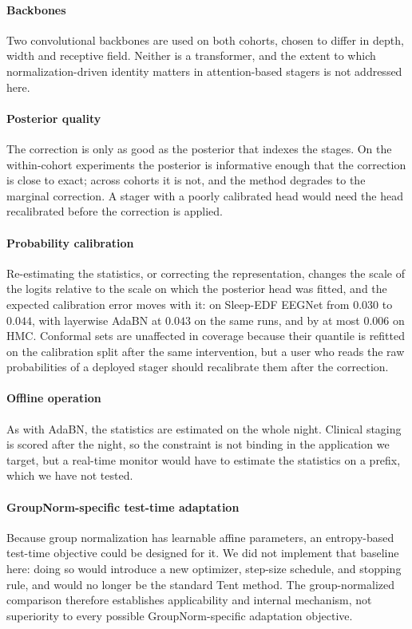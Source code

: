 \paragraph{Backbones}
Two convolutional backbones are used on both cohorts, chosen to differ in
depth, width and receptive field. Neither is a transformer, and the extent to
which normalization-driven identity matters in attention-based stagers is not
addressed here.

\paragraph{Posterior quality}
The correction is only as good as the posterior that indexes the stages. On
the within-cohort experiments the posterior is informative enough that the
correction is close to exact; across cohorts it is not, and the method
degrades to the marginal correction. A stager with a poorly calibrated head
would need the head recalibrated before the correction is applied.

\paragraph{Probability calibration}
Re-estimating the statistics, or correcting the representation, changes the
scale of the logits relative to the scale on which the posterior head was
fitted, and the expected calibration error moves with it: on Sleep-EDF EEGNet
from $0.030$ to $0.044$, with layerwise AdaBN at $0.043$ on the same runs, and
by at most $0.006$ on HMC. Conformal sets are
unaffected in coverage because their quantile is refitted on the calibration
split after the same intervention, but a user who reads the raw probabilities
of a deployed stager should recalibrate them after the correction.

\paragraph{Offline operation}
As with AdaBN, the statistics are estimated on the whole night. Clinical
staging is scored after the night, so the constraint is not binding in the
application we target, but a real-time monitor would have to estimate the
statistics on a prefix, which we have not tested.

\paragraph{GroupNorm-specific test-time adaptation}
Because group normalization has learnable affine parameters, an entropy-based
test-time objective could be designed for it. We did not implement that
baseline here: doing so would introduce a new optimizer, step-size schedule,
and stopping rule, and would no longer be the standard Tent method. The
group-normalized comparison therefore establishes applicability and internal
mechanism, not superiority to every possible GroupNorm-specific adaptation
objective.

